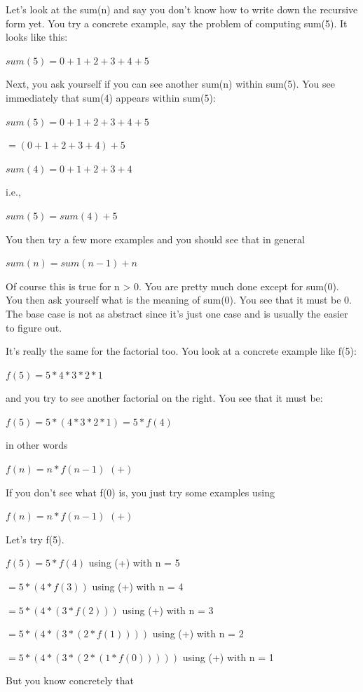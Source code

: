 Let's look at the sum(n) and say you
don't know how to write down the recursive form yet. You
try a concrete example, say the problem of computing sum(5). It looks
like this:

$sum(5) = 0 + 1 + 2 + 3 + 4 + 5$

Next, you ask yourself if you can see another sum(n) within sum(5). You
see immediately that sum(4) appears within sum(5):

$sum(5) = 0 + 1 + 2 + 3 + 4 + 5$

$= (0 + 1 + 2 + 3 + 4) + 5$

$sum(4) = 0 + 1 + 2 + 3 + 4$

i.e.,

$sum(5) = sum(4) + 5$

You then try a few more examples and you should see that in general

$sum(n) = sum(n - 1) + n$

Of course this is true for n > 0. You are pretty much done
except for sum(0). You then ask yourself what is the meaning of sum(0).
You see that it must be 0. The base case is not as abstract since
it's just one case and is usually the easier to figure
out.

It's really the same for the factorial too. You look at
a concrete example like f(5):

$f(5) = 5 * 4 * 3 * 2 * 1$

and you try to see another factorial on the right. You see that it must
be:

$f(5) = 5 * (4 * 3 * 2 * 1) = 5 * f(4)$

in other words

$f(n) = n * f(n - 1)$ \hspace{1cm} $(+)$

If you don't see what f(0) is, you just try some
examples using

$f(n) = n * f(n - 1)$ \hspace{1cm} $(+)$

Let's try f(5).

$f(5) = 5 * f(4)$ using (+) with n = 5

$= 5 * (4 * f(3))$ using (+) with n = 4

$= 5 * (4 * (3 * f(2)))$ using (+) with n = 3

$= 5 * (4 * (3 * (2 * f(1))))$ using (+) with n = 2

$= 5 * (4 * (3 * (2 * (1 * f(0)))))$ using (+) with n = 1

But you know concretely that

